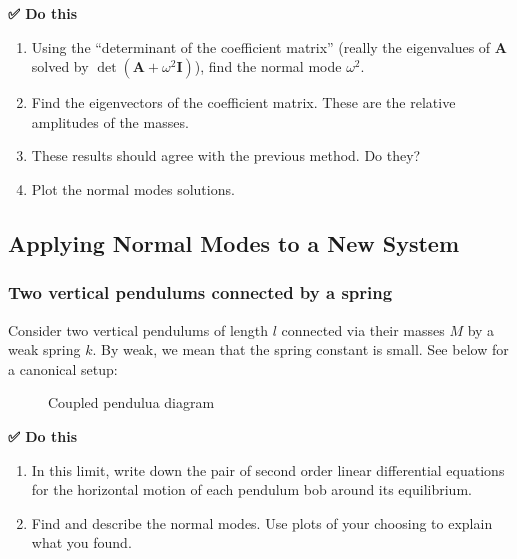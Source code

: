 \textbf{✅ Do this}

\begin{enumerate}
\def\labelenumi{\arabic{enumi}.}
\tightlist
\item
  Using the ``determinant of the coefficient matrix'' (really the
  eigenvalues of \(\pmb{A}\) solved by
  \(\det(\pmb{A}+\omega^2\pmb{I})\)), find the normal mode \(\omega^2\).
\item
  Find the eigenvectors of the coefficient matrix. These are the
  relative amplitudes of the masses.
\item
  These results should agree with the previous method. Do they?
\item
  Plot the normal modes solutions.
\end{enumerate}

\begin{Shaded}
\begin{Highlighting}[]
\end{Highlighting}
\end{Shaded}

\subsection{Applying Normal Modes to a New
System}\label{applying-normal-modes-to-a-new-system}

\subsubsection{Two vertical pendulums connected by a
spring}\label{two-vertical-pendulums-connected-by-a-spring}

Consider two vertical pendulums of length \(l\) connected via their
masses \(M\) by a weak spring \(k\). By weak, we mean that the spring
constant is small. See below for a canonical setup:

\begin{figure}
\centering
{}
\caption{Coupled pendulua diagram}
\end{figure}

\textbf{✅ Do this}

\begin{enumerate}
\def\labelenumi{\arabic{enumi}.}
\tightlist
\item
  In this limit, write down the pair of second order linear differential
  equations for the horizontal motion of each pendulum bob around its
  equilibrium.
\item
  Find and describe the normal modes. Use plots of your choosing to
  explain what you found.
\end{enumerate}

